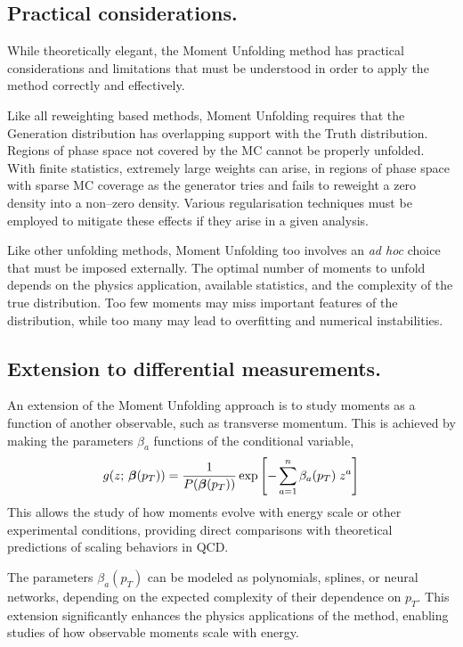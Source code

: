     \subsection{Practical considerations.}
        While theoretically elegant, the Moment Unfolding method has practical considerations and limitations that must be understood in order to apply the method correctly and effectively.

        Like all reweighting based methods, Moment Unfolding requires that the Generation distribution has overlapping support with the Truth distribution.
        Regions of phase space not covered by the MC cannot be properly unfolded.
        With finite statistics, extremely large weights can arise, in regions of phase space with sparse MC coverage as the generator tries and fails to reweight a zero density into a non--zero density.
        Various regularisation techniques must be employed to mitigate these effects if they arise in a given analysis.
        
        Like other unfolding methods, Moment Unfolding too involves an \textit{ad hoc} choice that must be imposed externally.
        The optimal number of moments to unfold depends on the physics application, available statistics, and the complexity of the true distribution.
        Too few moments may miss important features of the distribution, while too many may lead to overfitting and numerical instabilities.
    \subsection{Extension to differential measurements.}
        An extension of the Moment Unfolding approach is to study moments as a function of another observable, such as transverse momentum.
        This is achieved by making the parameters $\beta_a$ functions of the conditional variable,
        \[
            \label{eq:pt-moment-gen}
            g(z;\,\vb*\beta\qty(p_T)) = \frac{1}{P\qty(\vb*{\beta}\qty(p_T))} \exp\left[-\sum_{a=1}^n \beta_a(p_T)\; z^a\right]
        \]
        This allows the study of how moments evolve with energy scale or other experimental conditions, providing direct comparisons with theoretical predictions of scaling behaviors in QCD.

        The parameters $\beta_a(p_T)$ can be modeled as polynomials, splines, or neural networks, depending on the expected complexity of their dependence on $p_T$.
        This extension significantly enhances the physics applications of the method, enabling studies of how observable moments scale with energy.

